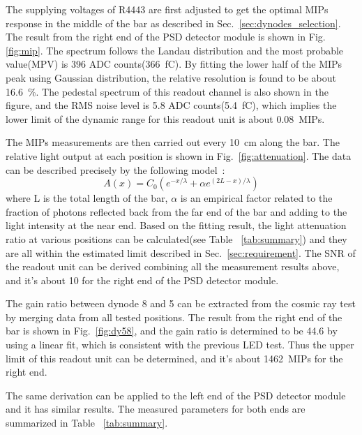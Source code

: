 \documentclass[5p, times]{elsarticle}
\begin{document}
The supplying voltages of R4443 are first adjusted to get the optimal MIPs response in the middle of the bar as described in Sec.~\ref{sec:dynodes_selection}.
The result from the right end of the PSD detector module is shown in Fig.\ref{fig:mip}.
The spectrum follows the Landau distribution and the most probable value(MPV) is 396 ADC counts(\SI{366}{\femto\coulomb}).
By fitting the lower half of the MIPs peak using Gaussian distribution, the relative resolution is found to be about \SI{16.6}{\percent}.
The pedestal spectrum of this readout channel is also shown in the figure, and the RMS noise level is 5.8 ADC counts(\SI{5.4}{\femto\coulomb}), which implies the lower limit of the dynamic range for this readout unit is about \SI{0.08}{MIPs}.

The MIPs measurements are then carried out every \SI{10}{\centi\meter} along the bar.
The relative light output at each position is shown in Fig.~\ref{fig:attenuation}.
The data can be described precisely by the following model~\cite{taiuti_measurement_1996}:
\begin{equation}
A(x)=C_0(e^{-x/\lambda} + \alpha e^{(2L-x)/\lambda})
\end{equation} 
where L is the total length of the bar, $\alpha$ is an empirical factor related to the fraction of photons reflected back from the far end of the bar and adding to the light intensity at the near end.
Based on the fitting result, the light attenuation ratio at various positions can be calculated(see Table ~\ref{tab:summary}) and they are all within the estimated limit described in Sec.~\ref{sec:requirement}.
The SNR of the readout unit can be derived combining all the measurement results above, and it's about 10 for the right end of the PSD detector module.

The gain ratio between dynode 8 and 5 can be extracted from the cosmic ray test by merging data from all tested positions.
The result from the right end of the bar is shown in Fig.~\ref{fig:dy58}, and the gain ratio is determined to be 44.6 by using a linear fit, which is consistent with the previous LED test.
Thus the upper limit of this readout unit can be determined, and it's about  \SI{1462}{MIPs} for the right end.

The same derivation can be applied to the left end of the PSD detector module and it has similar results.
The measured parameters for both ends are summarized in Table ~\ref{tab:summary}. 
\end{document}

